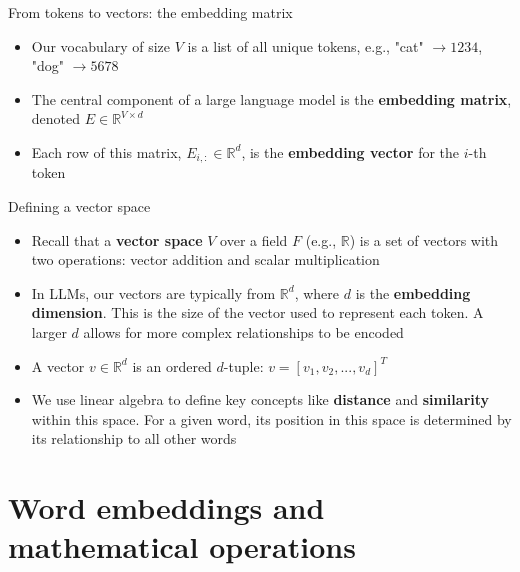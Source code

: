 \documentclass[aspectratio=169]{beamer}\usepackage[]{graphicx}\usepackage[]{xcolor}
\makeatletter
\newcommand{\defword}[1]{\textbf{\textcolor{beamer@blendedblue}{#1}}}
\makeatother
\begin{document}
\begin{frame}{From tokens to vectors: the embedding matrix}
\begin{itemize}
\item Our vocabulary of size $V$ is a list of all unique tokens, e.g., "cat" $\to 1234$, "dog" $\to 5678$
\vfill
\item The central component of a large language model is the \defword{embedding matrix}, denoted $E \in \mathbb{R}^{V \times d}$
\vfill
\item Each row of this matrix, $E_{i,:} \in \mathbb{R}^d$, is the \defword{embedding vector} for the $i$-th token
\end{itemize}
\end{frame}

\begin{frame}{Defining a vector space}
\begin{itemize}
\item Recall that a \defword{vector space} $V$ over a field $F$ (e.g., $\mathbb{R}$) is a set of vectors with two operations: vector addition and scalar multiplication
\vfill
\item In LLMs, our vectors are typically from $\mathbb{R}^d$, where $d$ is the \defword{embedding dimension}. This is the size of the vector used to represent each token. A larger $d$ allows for more complex relationships to be encoded
\vfill
\item A vector $v \in \mathbb{R}^d$ is an ordered $d$-tuple: $v = [v_1, v_2, ..., v_d]^T$
\vfill
\item We use linear algebra to define key concepts like \textbf{distance} and \textbf{similarity} within this space. For a given word, its position in this space is determined by its relationship to all other words
\end{itemize}
\end{frame}

\section{Word embeddings and mathematical operations}
\end{document}
